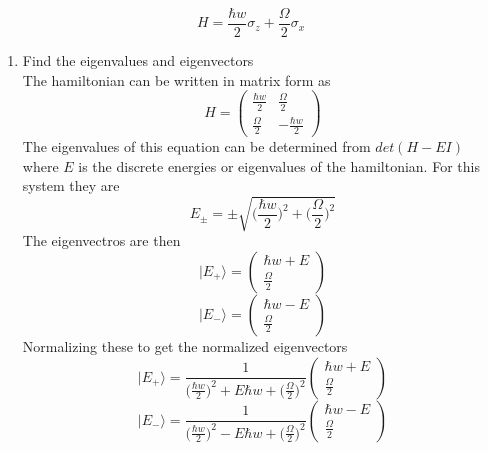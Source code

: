 \documentclass[12pt]{article}
\newcommand{\ket}[1]{\vert{#1}\rangle}
\begin{document}
\begin{enumerate}
$$ H = \frac{\hbar w}{2} \sigma_z + \frac{\Omega}{2} \sigma_x $$
\begin{enumerate}
    \item Find the eigenvalues and eigenvectors
    \\
    The hamiltonian can be written in matrix form as 
    $$ H = \left(\begin{array}{ccc} \frac{\hbar w}{2} & \frac{\Omega}{2} \\ \frac{\Omega}{2} & -\frac{\hbar w}{2} \end{array}\right)$$
    The eigenvalues of this equation can be determined from $det(H - EI)$ where $E$ is the discrete energies or eigenvalues of the hamiltonian. For this system they are 
    $$ E_{\pm} = \pm \sqrt{\Big(\frac{\hbar w}{2} \Big)^2 + \Big(\frac{\Omega}{2} \Big)^2}$$
    The eigenvectros are then 
    $$ \ket{E_+} = \left(\begin{array}{ccc} \hbar w + E \\ \frac{\Omega}{2}  \end{array}\right)$$
    $$ \ket{E_-} =  \left(\begin{array}{ccc} \hbar w - E \\ \frac{\Omega}{2}  \end{array}\right)$$
    Normalizing these to get the normalized eigenvectors 
    $$ \ket{E_+} = \frac{1}{\Big(\frac{\hbar w}{2} \Big)^2 + E \hbar w + \Big(\frac{\Omega}{2}\Big)^2} \left(\begin{array}{ccc} \hbar w + E \\ \frac{\Omega}{2}  \end{array}\right)$$
    $$ \ket{E_-} =  \frac{1}{\Big(\frac{\hbar w}{2} \Big)^2 - E \hbar w + \Big(\frac{\Omega}{2}\Big)^2} \left(\begin{array}{ccc} \hbar w - E \\ \frac{\Omega}{2}  \end{array}\right)$$
    

\end{enumerate}
\end{enumerate}
\end{document}
